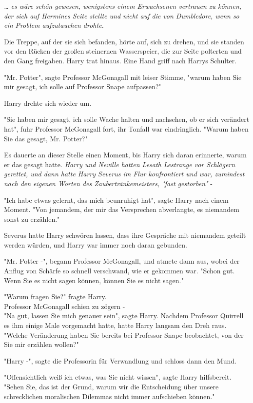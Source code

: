 {\emph{… es wäre schön gewesen, wenigstens einem Erwachsenen vertrauen zu können, der sich auf Hermines Seite stellte und nicht auf die von Dumbledore, wenn so ein Problem aufzutauchen drohte.}

Die Treppe, auf der sie sich befanden, hörte auf, sich zu drehen, und sie standen vor den Rücken der großen steinernen Wasserspeier, die zur Seite polterten und den Gang freigaben. Harry trat hinaus. Eine Hand griff nach Harrys Schulter.

"Mr. Potter", sagte Professor McGonagall mit leiser Stimme, "warum haben Sie mir gesagt, ich solle auf Professor Snape aufpassen?"

Harry drehte sich wieder um.

"Sie haben mir gesagt, ich solle Wache halten und nachsehen, ob er sich verändert hat", fuhr Professor McGonagall fort, ihr Tonfall war eindringlich. "Warum haben Sie das gesagt, Mr. Potter?"

Es dauerte an dieser Stelle einen Moment, bis Harry sich daran erinnerte, warum er das gesagt hatte. \emph{Harry und Neville hatten Lesath Lestrange vor Schlägern gerettet, und dann hatte Harry Severus im Flur konfrontiert und war, zumindest nach den eigenen Worten des Zaubertränkemeisters, "fast gestorben"} -

"Ich habe etwas gelernt, das mich beunruhigt hat", sagte Harry nach einem Moment. "Von jemandem, der mir das Versprechen abverlangte, es niemandem sonst zu erzählen."

Severus hatte Harry schwören lassen, dass ihre Gespräche mit niemandem geteilt werden würden, und Harry war immer noch daran gebunden.

"Mr. Potter -", begann Professor McGonagall, und atmete dann aus, wobei der Anflug von Schärfe so schnell verschwand, wie er gekommen war. "Schon gut. Wenn Sie es nicht sagen können, können Sie es nicht sagen."

"Warum fragen Sie?" fragte Harry.\\ Professor McGonagall schien zu zögern -\\ "Na gut, lassen Sie mich genauer sein", sagte Harry. Nachdem Professor Quirrell es ihm einige Male vorgemacht hatte, hatte Harry langsam den Dreh raus.\\ "Welche Veränderung haben Sie bereits bei Professor Snape beobachtet, von der Sie mir erzählen wollen?"

"Harry -", sagte die Professorin für Verwandlung und schloss dann den Mund.

"Offensichtlich weiß ich etwas, was Sie nicht wissen", sagte Harry hilfsbereit. "Sehen Sie, das ist der Grund, warum wir die Entscheidung über unsere schrecklichen moralischen Dilemmas nicht immer aufschieben können."

}
